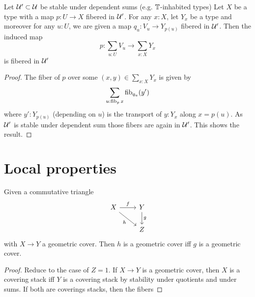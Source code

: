 \documentclass{article}
\begin{document}
\begin{lemma}{\label{lemma:AtlasSum}}
	Let $\mathcal{U}' \subset \mathcal{U}$ be stable under dependent sums (e.g. $\mathbb{T}$-inhabited types)
	Let $X$ be a type with a  map $p : U \to X$ fibered in $\mathcal{U}'$.  For any $x : X$, let $Y_x$ be a type and moreover for any $u : U$, we are given a map $q_u : V_u \to Y_{p(u)}$ fibered in $\mathcal{U}'$. Then the induced map
	\[
	p : \sum_{u : U} V_u \to \sum_{x : X} Y_{x}
	\]
	is fibered in $\mathcal{U}'$
\end{lemma}
\begin{proof}
	The fiber of $p$ over some $(x,y) \in \sum_{x :X} Y_x$ is given by
	\[
	\sum_{u : \operatorname{fib}_p x} \operatorname{fib}_{q_u} (y') 
	\]
	where $y' : Y_{p(u)}$ (depending on $u$) is the transport of $y : Y_x$ along $x = p(u)$. As $\mathcal{U}'$ is stable under dependent sum %
	those fibers are again in $\mathcal{U}'$. This shows the result.
\end{proof}














\section{Local properties}

\begin{lemma}
	Given a commutative triangle%
	\[\begin{tikzcd}
		X & Y \\
		& Z
		\arrow["f", from=1-1, to=1-2]
		\arrow["h"', from=1-1, to=2-2]
		\arrow["g", from=1-2, to=2-2]
	\end{tikzcd}\]
with $X \to Y$ a geometric cover. Then $h$ is a geometric cover iff $g$ is a geometric cover.
\end{lemma}
\begin{proof}
	Reduce to the case of $Z = 1$. If $X \to Y$ is a geometric cover, then $X$ is a covering stack iff $Y$ is a covering stack by stability under quotients and under sums. If both are coverings stacks, then the fibers 
\end{proof}
\end{document}
